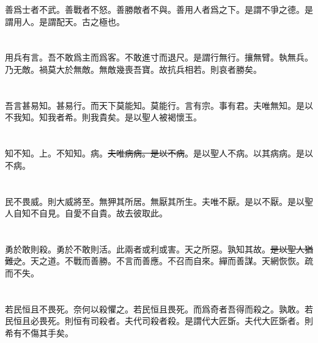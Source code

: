 \documentclass[a5paper]{ctexbook}
\newcommand{\bo}[1]{\textcolor[RGB]{0,255,255}{#1}}
\def\del{\sout}
\begin{document}
    善爲士者不武。善戰者不怒。善勝敵者不與。善用人者爲之下。是謂不爭之德。是謂\bo{用人}。是謂配天。古之極\bo{也}。

    \chapter{}

    用兵有言。吾不敢爲主而爲客。不敢進寸而退尺。是謂行無行。攘無臂。\bo{執無兵。乃无敵}。禍莫大於\bo{無敵}。\bo{無敵}幾喪吾寶。故抗兵相\bo{若}。\bo{則}哀者勝矣。

    \chapter{}

    吾言甚易知。甚易行。\bo{而}天下莫能知。莫能行。言有宗。事有君。夫唯無知。是以不我知。知我者希。\bo{則我貴矣}。是以聖人被褐懷玉。

    \chapter{}

    知不知。上。不知知。病。\bo{\del{夫唯病病。是以不病}}。\bo{是以}聖人不病。以其病病。是以不病。

    \chapter{}

    民不畏威。則大威\bo{將}至。無狎其所居。無厭其所生。夫唯不厭。是以不厭。是以聖人自知不自見。自愛不自貴。故去彼取此。

    \chapter{}

    勇於敢則殺。勇於不敢則活。此兩者或利或害。天之所惡。孰知其故。\bo{\del{是以聖人猶難之}}。天之道。不戰而善勝。不言而善應。不召而自來。\bo{繟}而善謀。天網恢恢。疏而不失。

    \chapter{}

    \bo{若民恒且不畏死}。奈何以\bo{殺}懼之。若民\bo{恒}且畏死。而爲奇者吾得而殺之。孰敢。\bo{若民恒且必畏死。則恒有司殺者}。夫代司殺者殺。是謂代大匠斲。夫代大匠斲者。\bo{則}希有不傷其手矣。

    \chapter{}
\end{document}
